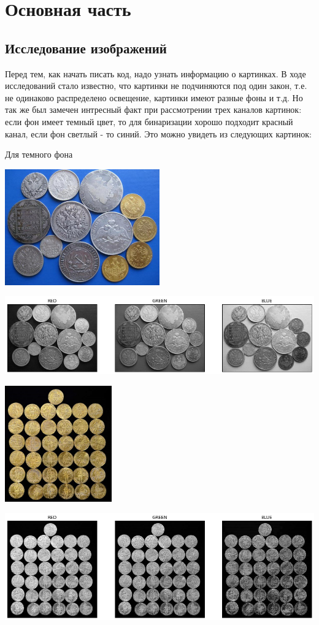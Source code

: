 \documentclass[12pt, a4paper]{article}
\begin{document}
	\newpage
	\section{Основная часть}
		\subsection{Исследование изображений}

			Перед тем, как начать писать код, надо узнать информацию о картинках. В ходе исследований стало известно, что картинки не подчиняются под один закон, т.е. не одинаково распределено освещение, картинки имеют разные фоны и т.д. Но так же был замечен интресный факт при рассмотрении трех каналов картинок: если фон имеет темный цвет, то для бинаризации хорошо подходит красный канал, если фон светлый - то синий. Это можно увидеть из следующих картинок:

			\begin{center}
				Для темного фона

				\includegraphics[height=5cm]{Money_1.png}

				\includegraphics[width=15cm]{1.png}

				\includegraphics[height=5cm]{Money_8.png}

				\includegraphics[width=15cm]{8.png}
			\end{center}
\end{document}
